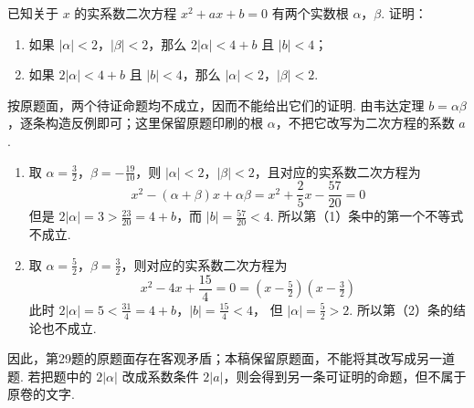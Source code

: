 \documentclass[UTF8,a4paper,oneside,11pt]{ctexbook}
\begin{document}
\begin{problem}
已知关于 \(x\) 的实系数二次方程 \(x^{2} + ax + b = 0\) 有两个实数根 \(\alpha\)，\(\beta\). 证明：

\begin{enumerate}
\item 如果 \(|\alpha| < 2\)，\(|\beta| < 2\)，那么 \(2|\alpha| < 4 + b\) 且 \(|b| < 4\)；
\item 如果 \(2|\alpha| < 4 + b\) 且 \(|b| < 4\)，那么 \(|\alpha| < 2\)，\(|\beta| < 2\).
\end{enumerate}
\end{problem}

\begin{solution}
按原题面，两个待证命题均不成立，因而不能给出它们的证明. 由韦达定理
\(b=\alpha\beta\)，逐条构造反例即可；这里保留原题印刷的根 \(\alpha\)，不把它改写为二次方程的系数 \(a\).

\begin{enumerate}
\item 取 \(\alpha=\frac{3}{2}\)，\(\beta=-\frac{19}{10}\)，则 \(|\alpha|<2\)，\(|\beta|<2\)，且对应的实系数二次方程为
\[
x^2-\left(\alpha+\beta\right)x+\alpha\beta=x^2+\frac{2}{5}x-\frac{57}{20}=0
\]
但是 \(2|\alpha|=3>\frac{23}{20}=4+b\)，而 \(|b|=\frac{57}{20}<4\).
所以第（1）条中的第一个不等式不成立.

\item 取 \(\alpha=\frac{5}{2}\)，\(\beta=\frac{3}{2}\)，则对应的实系数二次方程为
\[
x^2-4x+\frac{15}{4}=0=(x-\tfrac{5}{2})(x-\tfrac{3}{2})
\]
此时 \(2|\alpha|=5<\frac{31}{4}=4+b\)，\(|b|=\frac{15}{4}<4\)，
但 \(|\alpha|=\frac{5}{2}>2\). 所以第（2）条的结论也不成立.
\end{enumerate}

因此，第29题的原题面存在客观矛盾；本稿保留原题面，不能将其改写成另一道题. 若把题中的 \(2|\alpha|\) 改成系数条件 \(2|a|\)，则会得到另一条可证明的命题，但不属于原卷的文字.
\end{solution}

\end{document}
